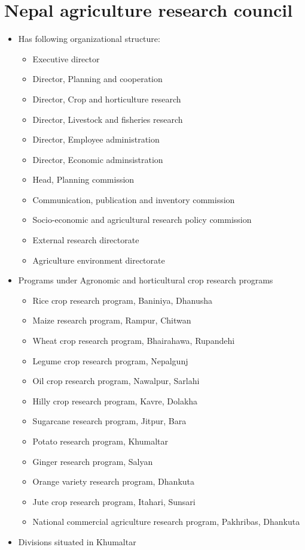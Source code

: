 \documentclass[
]{book}
\providecommand{\tightlist}{%
  \setlength{\itemsep}{0pt}\setlength{\parskip}{0pt}}
\begin{document}
\hypertarget{nepal-agriculture-research-council}{%
\section{Nepal agriculture research council}\label{nepal-agriculture-research-council}}

\begin{itemize}
\tightlist
\item
  Has following organizational structure:

  \begin{itemize}
  \tightlist
  \item
    Executive director
  \item
    Director, Planning and cooperation
  \item
    Director, Crop and horticulture research
  \item
    Director, Livestock and fisheries research
  \item
    Director, Employee administration
  \item
    Director, Economic adminsistration
  \item
    Head, Planning commission
  \item
    Communication, publication and inventory commission
  \item
    Socio-economic and agricultural research policy commission
  \item
    External research directorate
  \item
    Agriculture environment directorate
  \end{itemize}
\item
  Programs under Agronomic and horticultural crop research programs

  \begin{itemize}
  \tightlist
  \item
    Rice crop research program, Baniniya, Dhanusha
  \item
    Maize research program, Rampur, Chitwan
  \item
    Wheat crop research program, Bhairahawa, Rupandehi
  \item
    Legume crop research program, Nepalgunj
  \item
    Oil crop research program, Nawalpur, Sarlahi
  \item
    Hilly crop research program, Kavre, Dolakha
  \item
    Sugarcane research program, Jitpur, Bara
  \item
    Potato research program, Khumaltar
  \item
    Ginger research program, Salyan
  \item
    Orange variety research program, Dhankuta
  \item
    Jute crop research program, Itahari, Sunsari
  \item
    National commercial agriculture research program, Pakhribas, Dhankuta
  \end{itemize}
\item
  Divisions situated in Khumaltar


\end{itemize}
\end{document}
